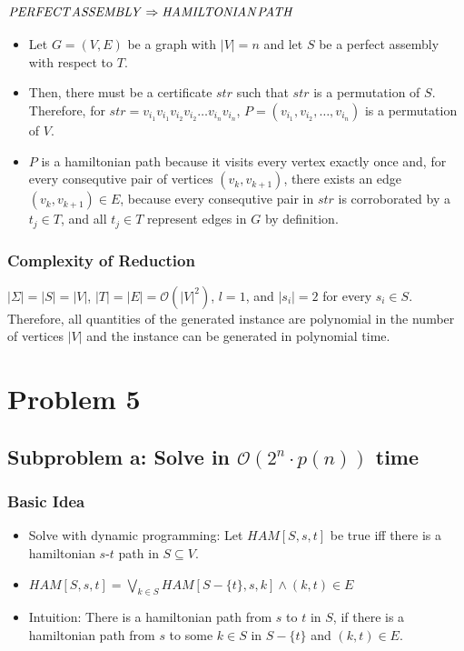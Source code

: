 \documentclass[12pt]{article}
\begin{document}
\subsubsection*{$\mathit{PERFECT\-ASSEMBLY} \Rightarrow \mathit{HAMILTONIAN\-PATH}$}
\begin{itemize}
	\item Let $G=(V,E)$ be a graph with $|V|=n$ and let $S$ be a perfect assembly with respect to $T$.
	\item Then, there must be a certificate $\mathit{str}$ such that $\mathit{str}$ is a permutation of $S$. Therefore, for $\mathit{str} = v_{i_1}v_{i_1}v_{i_2}v_{i_2} \ldots v_{i_n}v_{i_n}$, $P=(v_{i_1}, v_{i_2}, \ldots, v_{i_n})$ is a permutation of $V$.
	\item $P$ is a hamiltonian path because it visits every vertex exactly once and, for every consequtive pair of vertices $(v_{k}, v_{k+1})$, there exists an edge $(v_k, v_{k+1}) \in E$, because every consequtive pair in $\mathit{str}$ is corroborated by a $t_j \in T$, and all $t_j \in T$ represent edges in $G$ by definition.
\end{itemize}

\subsubsection*{Complexity of Reduction}
$|\Sigma| = |S| = |V|$, $|T| = |E| = \mathcal{O}(|V|^2)$, $l = 1$, and $|s_i| = 2$ for every $s_i \in S$. Therefore, all quantities of the generated instance are polynomial in the number of vertices $|V|$ and the instance can be generated in polynomial time.

\section*{Problem 5}
\subsection*{Subproblem a: Solve in $\mathcal{O}(2^n \cdot p(n))$ time}

\subsubsection*{Basic Idea}
\begin{itemize}
	\item Solve with dynamic programming: Let $\mathit{HAM}[S, s, t]$ be true iff there is a hamiltonian $s$-$t$ path in $S \subseteq V$.
	\item $\mathit{HAM}[S, s, t] = \bigvee_{k \in S} \mathit{HAM}[S - \{t\}, s, k] \wedge (k, t) \in E$
	\item Intuition: There is a hamiltonian path from $s$ to $t$ in $S$, if there is a hamiltonian path from $s$ to some $k \in S$ in $S-\{t\}$ and $(k,t) \in E$.
\end{itemize}
\end{document}
